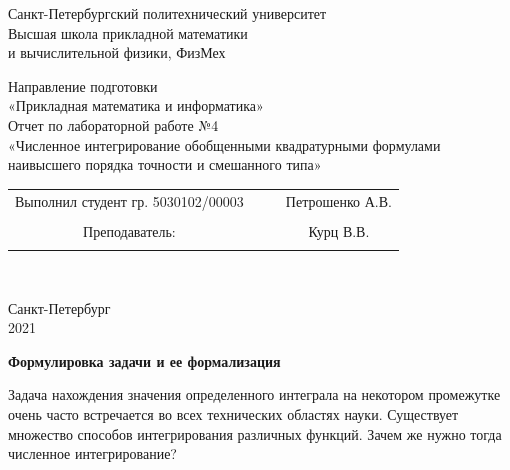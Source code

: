 \documentclass{article}
\begin{document}
	\begin{center}
		\hfill \break
		\begin{center}
			\huge{Санкт-Петербургский политехнический университет\\
				Высшая школа прикладной математики\\
				и вычислительной физики, ФизМех}
		\end{center}
		\hfill \break
		\hfill \break
		\hfill \break
		\hfill \break
		\hfill \break
		\huge{Направление подготовки\\
			«Прикладная математика и информатика»}\\
		\hfill \break
		\hfill \break
		\hfill \break
		\hfill \break
		\hfill \break
		\hfill \break
		\fontsize{14pt}{14pt}\selectfont
		Отчет по лабораторной работе №4\\
		«Численное интегрирование обобщенными квадратурными формулами наивысшего порядка точности и смешанного типа»\\
		\hfill \break
		\hfill \break
		\hfill \break
		\hfill \break
		\hfill \break
	\end{center}
	\hfill \break
	\hfill \break
	\fontsize{12pt}{12pt}\selectfont
	\begin{tabular}{cccc}
		\hspace{1cm}Выполнил студент гр. 5030102/00003 & {\hspace{3cm}} & & Петрошенко А.В. \\\\
		\hspace{-3cm}Преподаватель: &{\hspace{1cm}}& & {\hspace{1cm}} Курц В.В. \\\\
	\end{tabular}\\
	\hfill \break
	\hfill \break
	\hfill \break
	\hfill \break
	\hfill \break
	\hfill \break
	\begin{center} Санкт-Петербург\\ 
		2021\\
	\end{center}
	\thispagestyle{empty}
	\newpage
	\begin{center} \textbf{Формулировка задачи и ее формализация}\end{center}
	Задача нахождения значения определенного интеграла на некотором промежутке очень часто встречается во всех технических областях науки. Существует множество способов интегрирования различных функций. Зачем же нужно тогда численное интегрирование?
\end{document}
